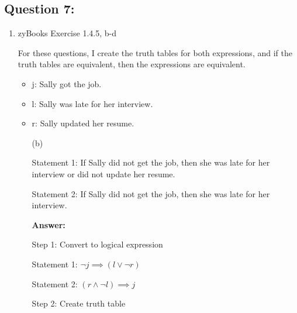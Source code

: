 \documentclass[12pt]{extreport}
\newcommand{\answer}[0]{\medskip \textbf{Answer:} \medskip}
\begin{document}
\subsection*{Question 7:}

\begin{enumerate}
    
    \item zyBooks Exercise 1.4.5, b-d
    
    For these questions, I create the truth tables for both expressions, and if the truth tables are equivalent, then the expressions are equivalent.
    
        \begin{itemize}
            \item j: Sally got the job.
            \item l: Sally was late for her interview.
            \item r: Sally updated her resume.
        \end{itemize}
    
        \begin{enumerate}
            
            \item[(b)] 

            Statement 1: If Sally did not get the job, then she was late for her interview or did not update her resume.

            Statement 2: If Sally did not get the job, then she was late for her interview. 
            
                \answer

                Step 1: Convert to logical expression

                Statement 1: \( \neg j \implies (l \lor \neg r) \)

                Statement 2: \( (r \land \neg l) \implies j \)

                \medskip

                Step 2: Create truth table


\end{enumerate}
\end{enumerate}
\end{document}
